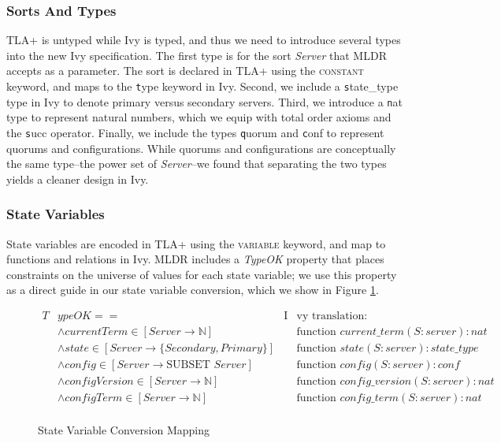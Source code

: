 \documentclass[runningheads]{llncs}
\newcommand{\tla}[1]{{\small\scshape #1}}
\newcommand{\ivy}[1]{{\small\texttt #1}}
\begin{document}
\subsubsection{Sorts And Types}

TLA+ is untyped while Ivy is typed, and thus we need to introduce several types into the new Ivy specification.  The first type is for the sort \textit{Server} that MLDR accepts as a parameter.  The sort is declared in TLA+ using the \tla{constant} keyword, and maps to the \ivy{type} keyword in Ivy.  Second, we include a \ivy{state\_type} type in Ivy to denote primary versus secondary servers.  Third, we introduce a \ivy{nat} type to represent natural numbers, which we equip with total order axioms and the \ivy{succ} operator.  Finally, we include the types \ivy{quorum} and \ivy{conf} to represent quorums and configurations.  While quorums and configurations are conceptually the same type--the power set of \textit{Server}--we found that separating the two types yields a cleaner design in Ivy.

\subsubsection{State Variables}

State variables are encoded in TLA+ using the \tla{variable} keyword, and map to functions and relations in Ivy.  MLDR includes a \textit{TypeOK} property that places constraints on the universe of values for each state variable; we use this property as a direct guide in our state variable conversion, which we show in Figure \ref{fig:statevar-map}.

\begin{figure}
  \begin{align*}
    T&ypeOK ==& \text{I}&\text{vy translation:}\\
      &\land currentTerm \in [Server \to \mathbb{N}]& &\text{function } current\_term(S:server) : nat\\
      &\land state \in [Server \to \{Secondary, Primary\}]& &\text{function } state(S:server) : state\_type\\
      &\land config \in [Server \to \text{SUBSET } Server]& &\text{function } config(S:server) : conf\\
      &\land configVersion \in [Server \to \mathbb{N}]& &\text{function } config\_version(S:server) : nat\\
      &\land configTerm \in [Server \to \mathbb{N}]& &\text{function } config\_term(S:server) : nat\\
  \end{align*}
  \caption{State Variable Conversion Mapping}
  \label{fig:statevar-map}
\end{figure}
\end{document}
